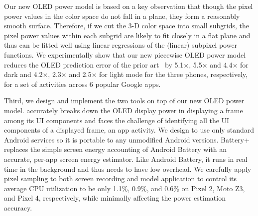 Our new OLED power model is based on a key observation that though the
pixel power values in the color space do not fall in a plane,
they form a reasonably smooth surface.  Therefore, if we cut
the 3-D color space into small subgrids, the pixel power values within
each subgrid are likely to fit closely in a flat plane and thus can be
fitted well using linear regressions of the (linear) subpixel power
functions. We experimentally show that our new piecewise OLED power model reduces the
OLED prediction error of the prior art~\cite{park2015accurate} by
5.1$\times$, 5.5$\times$ and 4.4$\times$ for dark
and 4.2$\times$, 2.3$\times$ and 2.5$\times$ for light mode for the three phones,
respectively, for a set of activities across 6 popular Google apps.



Third, we design and implement the two tools on top of our new OLED
power model. \name accurately breaks down the OLED display power in
displaying a frame among its UI components and faces the challenge of
identifying all the UI components of a displayed frame, \eg an app
activity.
We design \name to use only standard Android services so
it is portable to any unmodified Android versions.
Battery+ replaces
the simple screen energy accounting of Android Battery with an
accurate, per-app screen energy estimator.  Like Android
Battery, it runs in real time in the background and thus needs to have low
overhead. We carefully apply pixel sampling to both screen recording
and model application to control its average CPU utilization to be
only 1.1\%, 0.9\%, and 0.6\% on Pixel 2, Moto Z3, and Pixel 4, respectively,
while minimally affecting the power estimation accuracy.


